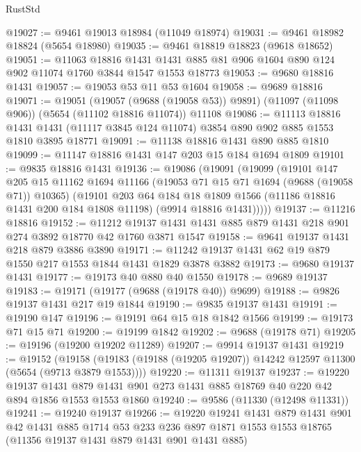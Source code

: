 \begin{lexlean}{RustStd}
\begin{coremodule}
@19027 := @9461 @19013 @18984 (@11049 @18974)
@19031 := @9461 @18982 @18824 (@5654 @18980)
@19035 := @9461 @18819 @18823 (@9618 @18652)
@19051 := @11063
    @18816
    @1431
    @1431
    @885
    @81
    @906
    @1604
    @890
    @124
    @902
    @11074
    @1760
    @3844
    @1547
    @1553
    @18773
@19053 := @9680 @18816 @1431
@19057 := @19053 @53 @11 @53 @1604
@19058 := @9689 @18816
@19071 := @19051
    (@19057 (@9688 (@19058 @53)) @9891)
    (@11097 (@11098 @906))
    (@5654 (@11102 @18816 @11074))
    @11108
@19086 := @11113
    @18816
    @1431
    @1431
    (@11117 @3845 @124 @11074)
    @3854
    @890
    @902
    @885
    @1553
    @1810
    @3895
    @18771
@19091 := @11138 @18816 @1431 @890 @885 @1810
@19099 := @11147 @18816 @1431 @147 @203 @15 @184 @1694 @1809
@19101 := @9835 @18816 @1431
@19136 := @19086
    (@19091
      (@19099
        (@19101
          @147
          @205
          @15
          @11162
          @1694
          @11166
          (@19053 @71 @15 @71 @1694 (@9688 (@19058 @71)) @10365)
          (@19101
            @203
            @64
            @184
            @18
            @1809
            @1566
            (@11186 @18816 @1431 @200 @184 @1808 @11198)
            (@9914 @18816 @1431)))))
@19137 := @11216 @18816
@19152 := @11212
    @19137
    @1431
    @1431
    @885
    @879
    @1431
    @218
    @901
    @274
    @3892
    @18770
    @42
    @1760
    @3871
    @1547
@19158 := @9641 @19137 @1431 @218 @879 @3886 @3890
@19171 := @11242 @19137 @1431 @62 @19 @879 @1550 @217 @1553 @1844 @1431 @1829 @3878 @3882
@19173 := @9680 @19137 @1431
@19177 := @19173 @40 @880 @40 @1550
@19178 := @9689 @19137
@19183 := @19171 (@19177 (@9688 (@19178 @40)) @9699)
@19188 := @9826 @19137 @1431 @217 @19 @1844
@19190 := @9835 @19137 @1431
@19191 := @19190 @147
@19196 := @19191 @64 @15 @18 @1842 @1566
@19199 := @19173 @71 @15 @71
@19200 := @19199 @1842
@19202 := @9688 (@19178 @71)
@19205 := @19196 (@19200 @19202 @11289)
@19207 := @9914 @19137 @1431
@19219 := @19152
    (@19158 (@19183 (@19188 (@19205 @19207)) @14242 @12597 @11300 (@5654 (@9713 @3879 @1553))))
@19220 := @11311 @19137
@19237 := @19220
    @19137
    @1431
    @879
    @1431
    @901
    @273
    @1431
    @885
    @18769
    @40
    @220
    @42
    @894
    @1856
    @1553
    @1553
    @1860
@19240 := @9586 (@11330 (@12498 @11331))
@19241 := @19240 @19137
@19266 := @19220
    @19241
    @1431
    @879
    @1431
    @901
    @42
    @1431
    @885
    @1714
    @53
    @233
    @236
    @897
    @1871
    @1553
    @1553
    @18765
    (@11356 @19137 @1431 @879 @1431 @901 @1431 @885)

\end{coremodule}
\end{lexlean}
